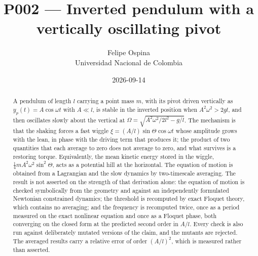 \documentclass[11pt,a4paper]{article}
\title{P002 --- Inverted pendulum with a vertically oscillating pivot}
\author{Felipe Ospina \\ \small Universidad Nacional de Colombia}
\date{2026-09-14}
\begin{document}
\maketitle

\begin{center}
\end{center}

\begin{abstract}
A pendulum of length $l$ carrying a point mass $m$, with its pivot driven
vertically as $y_p(t)=A\cos\omega t$ with $A\ll l$, is stable in the inverted
position when $A^2\omega^2>2gl$, and then oscillates slowly about the vertical
at $\Omega=\sqrt{A^2\omega^2/2l^2-g/l}$. The mechanism is that the shaking
forces a fast wiggle $\xi=(A/l)\sin\Theta\cos\omega t$ whose amplitude grows
with the lean, in phase with the driving term that produces it; the product of
two quantities that each average to zero does not average to zero, and what
survives is a restoring torque. Equivalently, the mean kinetic energy stored in
the wiggle, $\tfrac14 mA^2\omega^2\sin^2\Theta$, acts as a potential hill at the
horizontal. The equation of motion is obtained from a Lagrangian and the slow
dynamics by two-timescale averaging. The result is not asserted on the strength
of that derivation alone: the equation of motion is checked symbolically from
the geometry and against an independently formulated Newtonian constrained
dynamics; the threshold is recomputed by exact Floquet theory, which contains no
averaging; and the frequency is recomputed twice, once as a period measured on
the exact nonlinear equation and once as a Floquet phase, both converging on the
closed form at the predicted second order in $A/l$. Every check is also run
against deliberately mutated versions of the claim, and the mutants are
rejected. The averaged results carry a relative error of order $(A/l)^2$, which
is measured rather than asserted.
\end{abstract}
\end{document}
